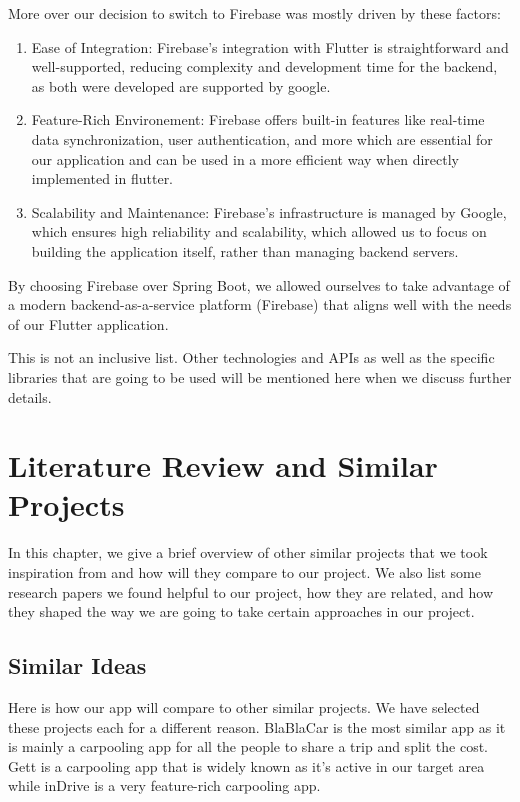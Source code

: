 \documentclass[a4paper, 12pt]{report} %
\begin{document}
                More over our decision to switch to Firebase was mostly driven by these factors:
                \begin{enumerate}
                    \item Ease of Integration: Firebase’s integration with Flutter is straightforward and well-supported, reducing complexity and development time for the backend, as both were developed are supported by google.
                    \item Feature-Rich Environement: Firebase offers built-in features like real-time data synchronization, user authentication, and more which are essential for our application and can be used in a more efficient way when directly implemented in flutter.
                    \item Scalability and Maintenance: Firebase’s infrastructure is managed by Google, which ensures high reliability and scalability,  which allowed us to focus on building the application itself, rather than managing backend servers.
                \end{enumerate}

                By choosing Firebase over Spring Boot, we allowed ourselves to take advantage of a modern backend-as-a-service platform (Firebase) that aligns well with the needs of our Flutter application. 

        This is not an inclusive list. Other technologies and APIs as well as the specific libraries that are going to be used will be mentioned here when we discuss further details.

    \pagebreak
    
    \section{Literature Review and Similar Projects}
        In this chapter, we give a brief overview of other similar projects that we took inspiration from and how will they compare to our project. We also list some research papers we found helpful to our project, how they are related, and how they shaped the way we are going to take certain approaches in our project.
        \subsection{Similar Ideas}
            Here is how our app will compare to other similar projects. We have selected these projects each for a different reason. BlaBlaCar is the most similar app as it is mainly a carpooling app for all the people to share a trip and split the cost. Gett is a carpooling app that is widely known as it's active in our target area while inDrive is a very feature-rich carpooling app.
\end{document}
